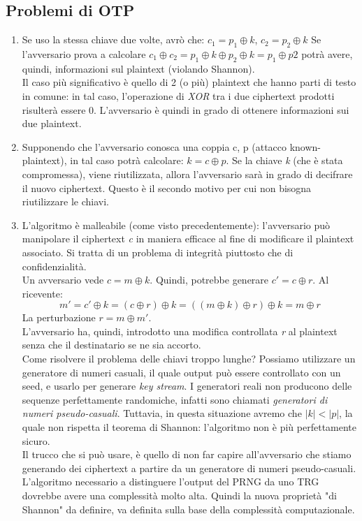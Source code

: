 \documentclass[a4paper,12pt]{article}
\begin{document}
\subsection{Problemi di OTP}
\begin{enumerate}
	\item Se uso la stessa chiave due volte, avrò che: $c_1 = p_1 \oplus k$, $c_2 = p_2 \oplus k$
	Se l'avversario prova a calcolare $c_1 \oplus c_2 = p_1 \oplus k \oplus p_2 \oplus k = p_1 \oplus p2$
	potrà avere, quindi, informazioni sul plaintext (violando Shannon). \\
	Il caso più significativo è quello di 2 (o più) plaintext che hanno parti di testo in comune:
	in tal caso, l'operazione di \textit{XOR} tra i due ciphertext prodotti risulterà essere 0.
	L'avversario è quindi in grado di ottenere informazioni sui due plaintext.
	\item Supponendo che l'avversario conosca una coppia c, p (attacco known-plaintext), in tal caso potrà calcolare:
	$k = c \oplus p$. Se la chiave \textit{k} (che è stata compromessa), viene riutilizzata, allora l'avversario sarà in grado 
	di decifrare il nuovo ciphertext. Questo è il secondo motivo per cui non bisogna riutilizzare le chiavi.
	\item L'algoritmo è malleabile (come visto precedentemente): l'avversario può manipolare il ciphertext \textit{c}
	in maniera efficace al fine di modificare il plaintext associato. Si tratta di un problema di integrità piuttosto che
	di confidenzialità. \\
	Un avversario vede $c = m \oplus k$. Quindi, potrebbe generare $c' = c \oplus r$.
	Al ricevente:
	$$ m' = c' \oplus k = (c \oplus r) \oplus k = ((m \oplus k) \oplus r) \oplus k = m \oplus r $$
	La perturbazione $r = m \oplus m'$. \\
	L'avversario ha, quindi, introdotto una modifica controllata \textit{r} al plaintext senza che
	il destinatario se ne sia accorto. \\
	Come risolvere il problema delle chiavi troppo lunghe? Possiamo utilizzare un generatore di numeri casuali, il quale output può essere controllato
	con un seed, e usarlo per generare \textit{key stream}. I generatori reali non producono delle sequenze perfettamente randomiche,
	infatti sono chiamati \textit{generatori di numeri pseudo-casuali}.
	Tuttavia, in questa situazione avremo che $|k| < |p|$, la quale non rispetta il teorema di Shannon:
	l'algoritmo non è più perfettamente sicuro. \\
	Il trucco che si può usare, è quello di non far capire all'avversario che stiamo generando dei ciphertext a partire da un generatore di numeri pseudo-casuali.
	L'algoritmo necessario a distinguere l'output del PRNG da uno TRG dovrebbe avere una complessità molto alta.
	Quindi la nuova proprietà "di Shannon" da definire, va definita sulla base della complessità computazionale.
\end{enumerate}
\end{document}
